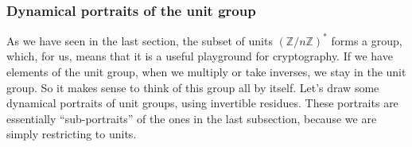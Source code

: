 \documentclass{article}
\theoremstyle{plain}
\theoremstyle{definition}
\theoremstyle{remark}
\numberwithin{theorem}{section}
\newcommand{\ZZ}{\mathbb{Z}}
\begin{document}
\subsubsection{Dynamical portraits of the unit group}

As we have seen in the last section, the subset of units $(\ZZ/n\ZZ)^*$ forms a group, which, for us, means that it is a useful playground for cryptography.  If we have elements of the unit group, when we multiply or take inverses, we stay in the unit group.  So it makes sense to think of this group all by itself.  Let's draw some dynamical portraits of unit groups, using invertible residues.  These portraits are essentially ``sub-portraits'' of the ones in the last subsection, because we are simply restricting to units.

\end{document}
